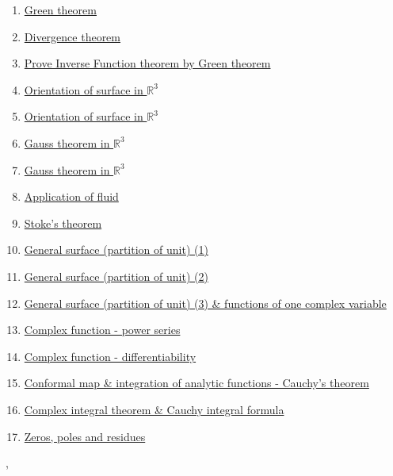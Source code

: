 \documentclass[11pt]{article}
\renewcommand{\today}{\shortmonthname[\the\month] \the \day,  \the\year}
\begin{document}
\begin{enumerate}
	\item \href{https://mp.weixin.qq.com/s/hWZqkCh-U-84YFBAlxCxfw}{Green theorem}	%
	\item \href{https://mp.weixin.qq.com/s/B9rRDwt1c_qbpvo4HAfr7Q}{Divergence theorem}	%
	\item \href{https://mp.weixin.qq.com/s/jl5Dm-h0FOb-LnGLHCnoWw}{Prove Inverse Function theorem by Green theorem}	%
	\item \href{https://mp.weixin.qq.com/s/ZhvRDHR2Qr1fAesaBAMjZQ}{Orientation of surface in $\mathbb{R}^3$ }	%
	\item \href{https://mp.weixin.qq.com/s/lH_4M5iuhdUYWTifm2XJ8w}{Orientation of surface in $\mathbb{R}^3$ }	%
	\item \href{https://mp.weixin.qq.com/s/2ndGfaeBQaUMIG_yTid1tg}{Gauss theorem in $\mathbb{R}^3$ }	%
	\item \href{https://mp.weixin.qq.com/s/zqPCUM7cgoBiJM8JPcGegg}{Gauss theorem in $\mathbb{R}^3$ }	%
	\item \href{https://mp.weixin.qq.com/s/z4d_PLC2h_3fjAVzNaubqw}{Application of fluid}	%
	\item \href{https://mp.weixin.qq.com/s/PYlTJj0QBEbQhaI7PiGoog}{Stoke's theorem}	%
	\item \href{https://mp.weixin.qq.com/s/oWj6BULQX2Gl1G7Pfpu-pg}{General surface (partition of unit) (1)}	%
	\item \href{https://mp.weixin.qq.com/s/kIFyjgRkmLdiMT_Mcid9Qg}{General surface (partition of unit) (2)}	%
	\item \href{https://mp.weixin.qq.com/s/ZVYIUHoouqtsnmmmY0PQkA}{General surface (partition of unit) (3) \& functions of one complex variable}	%
	\item \href{https://mp.weixin.qq.com/s/W7HT590gZWbkwAJmrF04Qw}{Complex function - power series}	%
	\item \href{https://mp.weixin.qq.com/s/9ZjDipFBq9plPhU3C2ZI8A}{Complex function - differentiability}	%
	\item \href{https://mp.weixin.qq.com/s/9-AEGn0ACllBCmeZ7ydI0w}{Conformal map \& integration of analytic functions - Cauchy's theorem}	%
	\item \href{https://mp.weixin.qq.com/s/5lW4yeB81NNozAqobEFMuw}{Complex integral theorem \& Cauchy integral formula}	%
	\item \href{https://mp.weixin.qq.com/s/RrXbgYPcq6Ou8zivAkJM-Q}{Zeros, poles and residues}	%
\end{enumerate}


%
\begin{flushright}
	\tiny \today 
\end{flushright}

\end{document}
